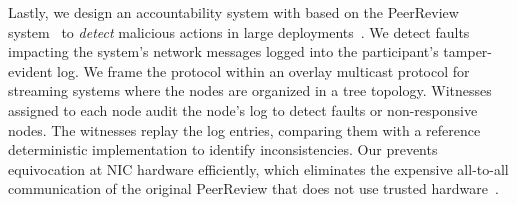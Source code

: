 

Lastly, we design an accountability system with \projecttitle{} based on the PeerReview system~\cite{peer-review} to {\em detect} malicious actions in large deployments~\cite{nfs, 10.1145/1218063.1217950}.  We detect faults impacting the system's network messages logged into the participant's tamper-evident log. We frame the protocol within an overlay multicast protocol for streaming systems where the nodes are organized in a tree topology. Witnesses assigned to each node audit the node's log to detect faults or non-responsive nodes. The witnesses replay the log entries, comparing them with a reference deterministic implementation to identify inconsistencies. 
Our \projecttitle{} prevents equivocation at NIC hardware efficiently, which eliminates the expensive all-to-all communication of the original PeerReview that does not use trusted hardware~\cite{levin2009trinc}.



